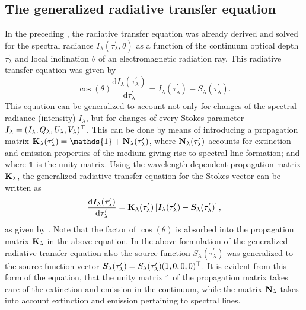 \documentclass[a4paper,12pt]{report}
\def\lk#1{{\color{black}{#1}}}
\begin{document}
\subsection{The generalized radiative transfer equation}
In the preceding \lk{sections}, the radiative transfer equation was already derived and solved for the spectral radiance $I_\lambda(\tau_\lambda^\prime, \theta)$ as a function of the continuum optical depth $\tau_\lambda^\prime$ and local inclination $\theta$ of an electromagnetic radiation ray. This radiative transfer equation was given by \begin{equation}
\cos(\theta)\frac{\mathrm{d}I_\lambda(\tau_\lambda^\prime)}{\mathrm{d}\tau_\lambda^\prime} = I_\lambda(\tau_\lambda^\prime)-S_\lambda(\tau_\lambda^\prime).
\end{equation} This equation can be generalized to account not only for changes of the spectral radiance (intensity) $I_\lambda$, but for changes of every Stokes parameter $\bm{I}_\lambda = (I_\lambda, Q_\lambda, U_\lambda, V_\lambda)^\top$. This can be done by means of introducing a propagation matrix $\matr{K}_\lambda(\tau_\lambda^\prime) = \mathds{1} + \matr{N}_\lambda(\tau_\lambda^\prime)$, where $\boldsymbol{\mathbf{N}}_\lambda(\tau_\lambda^\prime)$ accounts for extinction and emission properties of the medium giving rise to spectral line formation; and where $\mathds{1}$ is the unity matrix. Using the wavelength-dependent propagation matrix $\boldsymbol{\mathbf{K}}_\lambda$, the generalized radiative transfer equation for the Stokes vector can be written as \begin{equation}\label{eq:generalizedradtransfereq}
\frac{\mathrm{d}\bm{I}_\lambda(\tau_\lambda^\prime)}{\mathrm{d}\tau_\lambda^\prime} = \boldsymbol{\mathbf{K}}_\lambda(\tau_\lambda^\prime)\left[\bm{I}_\lambda(\tau_\lambda^\prime)-\bm{S}_\lambda(\tau_\lambda^\prime)\right],
\end{equation} as given by \cite[p.150]{delToroIniesta.2003}. Note that the factor of $\cos(\theta)$ is absorbed into the propagation matrix $\boldsymbol{\mathbf{K}}_\lambda$ in the above equation. In the above formulation of the generalized radiative transfer equation also the source function $S_\lambda(\tau_\lambda^\prime)$ was generalized to the source function vector $\bm{S}_\lambda(\tau_\lambda^\prime) = S_\lambda(\tau_\lambda^\prime)(1,0,0,0)^\top$. It is evident from this form of the equation, that the unity matrix $\mathds{1}$ of the propagation matrix takes care of the extinction and emission in the continuum, while the matrix $\boldsymbol{\mathbf{N}}_\lambda$ takes into account extinction and emission pertaining to spectral lines. 
\end{document}

